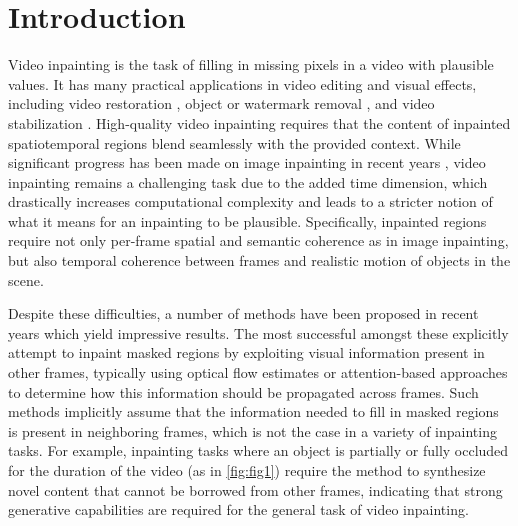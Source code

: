 \chapter{Introduction}
\label{sec:intro}

Video inpainting is the task of filling in missing pixels in a video with plausible values. It has many practical applications in video editing and visual effects, including video restoration \cite{restoration}, object or watermark removal \cite{occluding}, and video stabilization \cite{stabilization}. High-quality video inpainting requires that the content of inpainted spatiotemporal regions blend seamlessly with the provided context. While significant progress has been made on image inpainting in recent years \cite{palette, repaint, imin1, imin3, imin4, imin5}, video inpainting remains a challenging task due to the added time dimension, which drastically increases computational complexity and leads to a stricter notion of what it means for an inpainting to be plausible. Specifically, inpainted regions require not only per-frame spatial and semantic coherence as in image inpainting, but also temporal coherence between frames and realistic motion of objects in the scene.  


Despite these difficulties, a number of methods have been proposed in recent years which yield impressive results. The most successful amongst these explicitly attempt to inpaint masked regions by exploiting visual information present in other frames, typically using optical flow estimates \cite{temporally, endtoend, deepvideoinpainting, dfvi, flowedgeguided} or attention-based approaches \cite{learningjoint, fuseformer, onionpeel, copypaste} to determine how this information should be propagated across frames. Such methods implicitly assume that the information needed to fill in masked regions is present in neighboring frames, which is not the case in a variety of inpainting tasks. For example, inpainting tasks where an object is partially or fully occluded for the duration of the video (as in \cref{fig:fig1}) require the method to synthesize novel content that cannot be borrowed from other frames, indicating that strong generative capabilities are required for the general task of video inpainting. 

